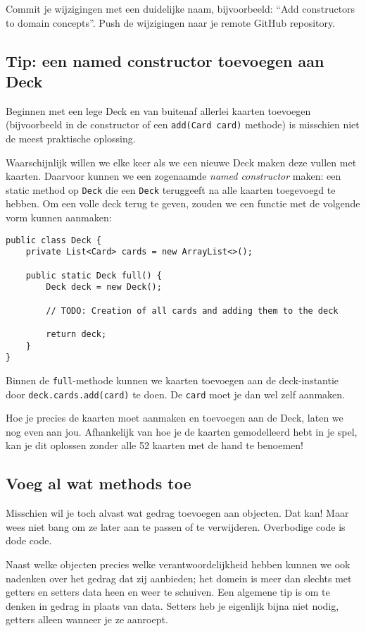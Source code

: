 Commit je wijzigingen met een duidelijke naam, 
bijvoorbeeld: ``Add constructors to domain concepts''. 
Push de wijzigingen naar je remote GitHub repository.

\subsection{Tip: een named constructor toevoegen aan Deck}
Beginnen met een lege Deck en van buitenaf allerlei kaarten toevoegen 
(bijvoorbeeld in de constructor of een \texttt{add(Card card)} methode)
is misschien niet de meest praktische oplossing.

Waarschijnlijk willen we elke keer als we een nieuwe Deck maken
deze vullen met kaarten. Daarvoor kunnen we een zogenaamde \textit{named constructor}
maken: een static method op \texttt{Deck} die een \texttt{Deck} teruggeeft 
na alle kaarten toegevoegd te hebben. Om een volle deck terug te geven, zouden 
we een functie met de volgende vorm kunnen aanmaken:

\begin{verbatim}
public class Deck {
    private List<Card> cards = new ArrayList<>();

    public static Deck full() {
        Deck deck = new Deck();

        // TODO: Creation of all cards and adding them to the deck

        return deck;
    }
}
\end{verbatim}

Binnen de \texttt{full}-methode kunnen we kaarten toevoegen aan de 
deck-instantie door \texttt{deck.cards.add(card)} te doen. De \texttt{card}
moet je dan wel zelf aanmaken.

Hoe je precies de kaarten moet aanmaken en toevoegen aan de Deck,
laten we nog even aan jou. Afhankelijk van hoe je de kaarten gemodelleerd hebt 
in je spel, kan je dit oplossen zonder alle 52 kaarten met de hand te benoemen!

\subsection{Voeg al wat methods toe}
Misschien wil je toch alvast wat gedrag toevoegen aan objecten.
Dat kan! Maar wees niet bang om ze later aan te passen of te verwijderen.
Overbodige code is dode code.

Naast welke objecten precies welke verantwoordelijkheid hebben 
kunnen we ook nadenken over het gedrag dat zij aanbieden; 
het domein is meer dan slechts met getters en setters data heen en weer te schuiven. 
Een algemene tip is om te denken in gedrag in plaats van data. 
Setters heb je eigenlijk bijna niet nodig, getters alleen wanneer je ze aanroept. 

